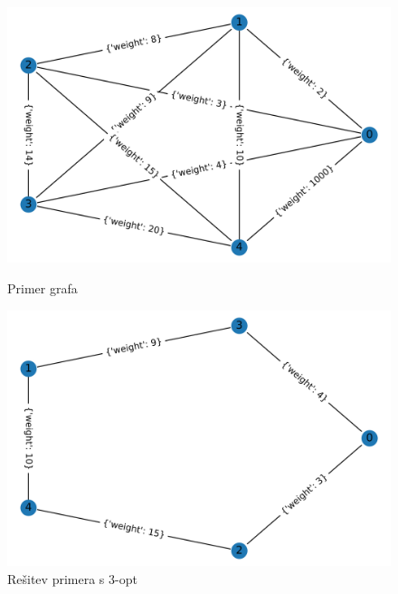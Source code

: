\documentclass[12pt, a4paper]{article}
\begin{document}
\begin{figure}[!h]
    
    \begin{minipage}{0.5\textwidth}
    \includegraphics[width=8 cm]{primeri/primer1.png}
    \caption{Primer grafa}
    \label{primer_3_opt}
  \end{minipage}
 \hspace{1cm}
  \begin{minipage}{0.5\textwidth}
    \includegraphics[width=8 cm]{primeri/primer1_3opt.png}
    \caption{Rešitev primera s 3-opt}
    \label{resitev_3_opt}
  \end{minipage}
    
\end{figure}

%    
%    
\end{document}
